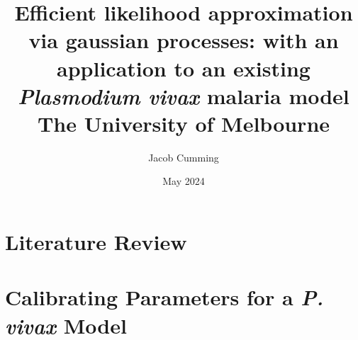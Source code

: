 \documentclass{book}
\begin{document}

\title{
{Efficient likelihood approximation via gaussian processes: 
with an application to an existing \emph{Plasmodium vivax} malaria model}\\
{\large The University of Melbourne}
}
\author{Jacob Cumming}


\date{May 2024}

\maketitle
{}
\tableofcontents

\listoftables
\listoffigures

% 
% 


\newpage


\part{Literature Review}



% 
% 


\part{Calibrating Parameters for a \emph{P. vivax} Model}



\printbibliography
\end{document}
